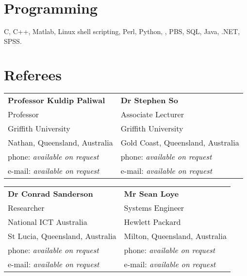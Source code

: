 \documentclass[margin,line]{resume}
\begin{document}
\begin{resume}
    \section{\mysidestyle Programming}

    C, C++, Matlab, Linux shell scripting, Perl, Python, \LaTeXe, PBS, SQL, Java, .NET, SPSS.






\section{\mysidestyle Referees}

\begin{tabular}{@{}p{6cm}p{6cm}}
\textbf{Professor Kuldip Paliwal}       &  \textbf{Dr Stephen So}                   \\
Professor                               &  Associate Lecturer                       \\
Griffith University                     &  Griffith University                      \\
Nathan, Queensland, Australia           &  Gold Coast, Queensland, Australia        \\
phone: \textsl{available on request}    &  phone: \textsl{available on request}     \\
e-mail: \textsl{available on request}   &  e-mail: \textsl{available on request}    \\
\end{tabular}

\begin{tabular}{@{}p{6cm}p{6cm}}
\textbf{Dr Conrad Sanderson}            &  \textbf{Mr Sean Loye}                    \\
Researcher                              &  Systems Engineer                         \\
National ICT Australia                  &  Hewlett Packard                          \\
St Lucia, Queensland, Australia         &  Milton, Queensland, Australia            \\
phone: \textsl{available on request}    &  phone: \textsl{available on request}     \\
e-mail: \textsl{available on request}   &  e-mail: \textsl{available on request}    \\
\end{tabular}



\end{resume}
\end{document}
